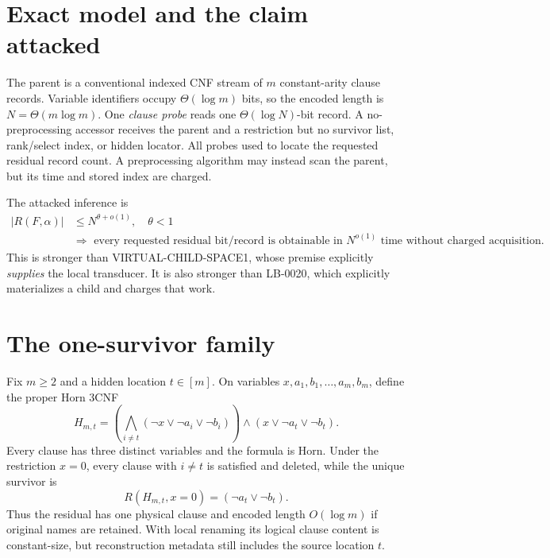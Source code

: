 \documentclass[11pt]{article}
\begin{document}
\section{Exact model and the claim attacked}

The parent is a conventional indexed CNF stream of $m$ constant-arity
clause records.  Variable identifiers occupy $\Theta(\log m)$ bits, so the
encoded length is $N=\Theta(m\log m)$.  One \emph{clause probe} reads one
$\Theta(\log N)$-bit record.  A no-preprocessing accessor receives the parent
and a restriction but no survivor list, rank/select index, or hidden locator.
All probes used to locate the requested residual record count.  A
preprocessing algorithm may instead scan the parent, but its time and stored
index are charged.

The attacked inference is
\begin{equation}
\tag{SCL}
\begin{aligned}
|R(F,\alpha)|&\le N^{\theta+o(1)},\quad\theta<1\\
&\Longrightarrow
\text{ every requested residual bit/record is obtainable in }N^{o(1)}
\text{ time without charged acquisition.}
\end{aligned}
\end{equation}
This is stronger than VIRTUAL-CHILD-SPACE1, whose premise explicitly
\emph{supplies} the local transducer.  It is also stronger than LB-0020,
which explicitly materializes a child and charges that work.

\section{The one-survivor family}

Fix $m\ge2$ and a hidden location $t\in[m]$.  On variables
$x,a_1,b_1,\ldots,a_m,b_m$, define the proper Horn 3CNF
\begin{equation}
H_{m,t}=
\left(\bigwedge_{i\ne t}(\neg x\vee\neg a_i\vee\neg b_i)\right)
\wedge (x\vee\neg a_t\vee\neg b_t).
\tag{1}
\end{equation}
Every clause has three distinct variables and the formula is Horn.  Under
the restriction $x=0$, every clause with $i\ne t$ is satisfied and deleted,
while the unique survivor is
\begin{equation}
R(H_{m,t},x=0)=(\neg a_t\vee\neg b_t).
\tag{2}
\end{equation}
Thus the residual has one physical clause and encoded length $O(\log m)$ if
original names are retained.  With local renaming its logical clause content
is constant-size, but reconstruction metadata still includes the source
location $t$.
\end{document}
